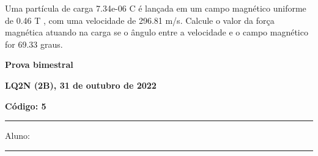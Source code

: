 \documentclass[12pt, addpoints]{exam}
\begin{document}
\begin{questions}
\begin{multicols*}{2}
\begin{oneparchoices}
\end{oneparchoices}
\question[20] Uma partícula de carga 7.34e-06 C é lançada em um campo magnético uniforme de    0.46 T , com uma velocidade de 296.81 m/s. Calcule o valor da força magnética atuando na carga se o ângulo entre a velocidade e o campo magnético for   69.33 graus.

\begin{oneparchoices}
\end{oneparchoices}
\end{multicols*}
\end{questions}
\newpage
        \begin{minipage}[b]{0.75\linewidth}
            \begin{flushleft}
                {\bf \large Prova bimestral}
            \end{flushleft}
            \begin{flushleft}
                {\bf \large LQ2N (2B), 31 de outubro de 2022}
            \end{flushleft}
        \end{minipage}
        \begin{minipage}[b]{0.20\linewidth}
            \begin{flushright}
                {\bf \large Código: 5}
            \end{flushright}
        \end{minipage}
        \vspace{0.5cm} \hrule \vspace{0.5cm}
        \begin{minipage}{0.75\linewidth}
            Aluno:
        \end{minipage}
        \vspace{0.5cm} \hrule \vspace{0.5cm}
\end{document}
